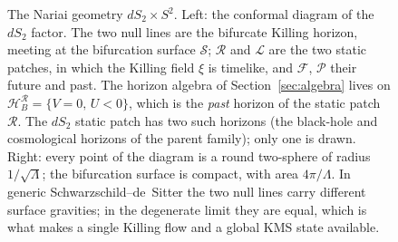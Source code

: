 \documentclass[11pt]{article}
\newcommand{\Nariai}{Nariai}
\begin{document}
\begin{figure}[t]
\centering
{}
\caption{The \Nariai{} geometry $dS_2 \times S^2$. Left: the conformal diagram of the $dS_2$ factor. The two null lines are the bifurcate Killing horizon, meeting at the bifurcation surface $\mathcal{S}$; $\mathcal{R}$ and $\mathcal{L}$ are the two static patches, in which the Killing field $\xi$ is timelike, and $\mathcal{F}$, $\mathcal{P}$ their future and past. The horizon algebra of Section~\ref{sec:algebra} lives on $\mathcal{H}^{\mathcal{R}}_B=\{V=0,\,U<0\}$, which is the \emph{past} horizon of the static patch $\mathcal R$. The $dS_2$ static patch has two such horizons (the black-hole and cosmological horizons of the parent family); only one is drawn. Right: every point of the diagram is a round two-sphere of radius $1/\sqrt{\Lambda}$; the bifurcation surface is compact, with area $4\pi/\Lambda$. In generic Schwarzschild--de~Sitter the two null lines carry different surface gravities; in the degenerate limit they are equal, which is what makes a single Killing flow and a global KMS state available.}
\label{fig:nariai}
\end{figure}
\end{document}
